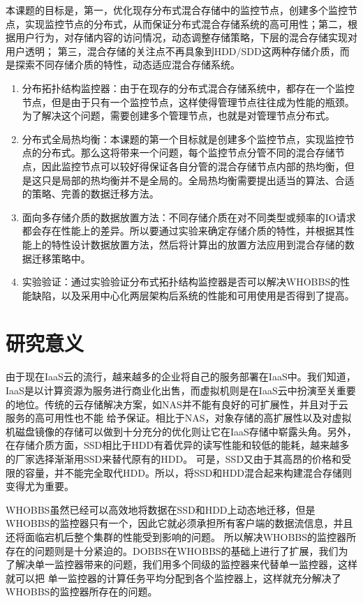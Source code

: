 本课题的目标是，第一，优化现存分布式混合存储中的监控节点，创建多个监控节点，实现监控节点的分布式，从而保证分布式混合存储系统的高可用性；第二，根据用户行为，对存储内容的访问情况，动态调整存储策略，下层的混合存储实现对用户透明；
第三，混合存储的关注点不再具象到HDD/SDD这两种存储介质，而是探索不同存储介质的特性，动态适应混合存储系统。

\begin{enumerate}[noitemsep,topsep=0pt,parsep=0pt,partopsep=0pt]
	\item 分布拓扑结构监控器：由于在现存的分布式混合存储系统中，都存在一个监控节点，但是由于只有一个监控节点，这样使得管理节点往往成为性能的瓶颈。为了解决这个问题，需要创建多个管理节点，也就是对管理节点分布式。
	\item 分布式全局热均衡：本课题的第一个目标就是创建多个监控节点，实现监控节点的分布式。那么这将带来一个问题，每个监控节点分管不同的混合存储节点，因此监控节点可以较好得保证各自分管的混合存储节点内部的热均衡，但是这只是局部的热均衡并不是全局的。全局热均衡需要提出适当的算法、合适的策略、完善的数据迁移方法。	
	\item 面向多存储介质的数据放置方法：不同存储介质在对不同类型或频率的IO请求都会存在性能上的差异。所以要通过实验来确定存储介质的特性，并根据其性能上的特性设计数据放置方法，然后将计算出的放置方法应用到混合存储的数据迁移策略中。
	\item 实验验证：通过实验验证分布式拓扑结构监控器是否可以解决WHOBBS的性能缺陷，以及采用中心化两层架构后系统的性能和可用使用是否得到了提高。
\end{enumerate}

\section{研究意义}
由于现在IaaS云的流行，越来越多的企业将自己的服务部署在IaaS中。我们知道，IaaS是以计算资源为服务进行商业化出售，而虚拟机则是在IaaS云中扮演至关重要的地位。传统的云存储解决方案，如NAS并不能有良好的可扩展性，并且对于云服务的高可用性也不能
给予保证。相比于NAS，对象存储的高扩展性以及对虚拟机磁盘镜像的存储可以做到十分充分的优化则让它在IaaS存储中崭露头角。另外，在存储介质方面，SSD相比于HDD有着优异的读写性能和较低的能耗，越来越多的厂家选择渐渐用SSD来替代原有的HDD。
可是，SSD又由于其高昂的价格和受限的容量，并不能完全取代HDD。所以，将SSD和HDD混合起来构建混合存储则变得尤为重要。

WHOBBS虽然已经可以高效地将数据在SSD和HDD上动态地迁移，但是WHOBBS的监控器只有一个，因此它就必须承担所有客户端的数据流信息，并且还将面临宕机后整个集群的性能受到影响的问题。
所以解决WHOBBS的监控器所存在的问题则是十分紧迫的。DOBBS在WHOBBS的基础上进行了扩展，我们为了解决单一监控器带来的问题，我们用多个同级的监控器来代替单一监控器，这样就可以把
单一监控器的计算任务平均分配到各个监控器上，这样就充分解决了WHOBBS的监控器所存在的问题。

